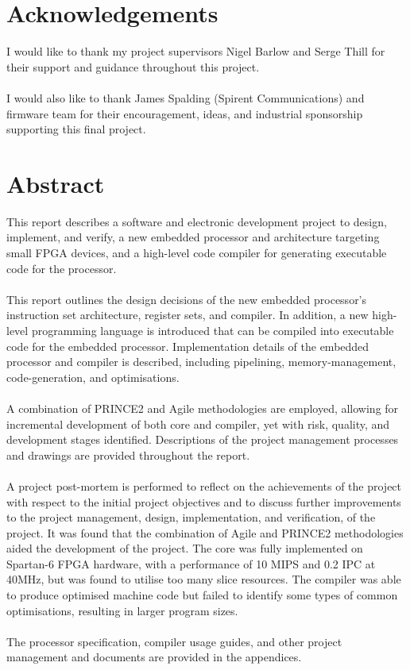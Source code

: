 \documentclass[11pt,a4paper]{report}
\begin{document}
\newpage
\chapter*{Acknowledgements}
I would like to thank my project supervisors Nigel Barlow and Serge Thill for their support and guidance throughout this project. 
\\\\
I would also like to thank James Spalding (Spirent Communications) and firmware team for their encouragement, ideas, and industrial sponsorship supporting this final project.

\newpage
\chapter*{Abstract}
\startcontents[chapters]
\noindent
This report describes a software and electronic development project to design, implement, and verify, a new embedded processor and architecture targeting small FPGA devices, and a high-level code compiler for generating executable code for the processor.
\\\\
This report outlines the design decisions of the new embedded processor's instruction set architecture, register sets, and compiler. In addition, a new high-level programming language is introduced that can be compiled into executable code for the embedded processor. Implementation details of the embedded processor and compiler is described, including pipelining, memory-management, code-generation, and optimisations. 
\\\\
A combination of PRINCE2 and Agile methodologies are employed, allowing for incremental development of both core and compiler, yet with risk, quality, and development stages identified. Descriptions of the project management processes and drawings are provided throughout the report.
\\\\
A project post-mortem is performed to reflect on the achievements of the project with respect to the initial project objectives and to discuss further improvements to the project management, design, implementation, and verification, of the project. It was found that the combination of Agile and PRINCE2 methodologies aided the development of the project. The core was fully implemented on Spartan-6 FPGA hardware, with a performance of 10 MIPS and 0.2 IPC at 40MHz, but was found to utilise too many slice resources. The compiler was able to produce optimised machine code but failed to identify some types of common optimisations, resulting in larger program sizes.
\\\\
The processor specification, compiler usage guides, and other project management and documents are provided in the appendices.
\end{document}
